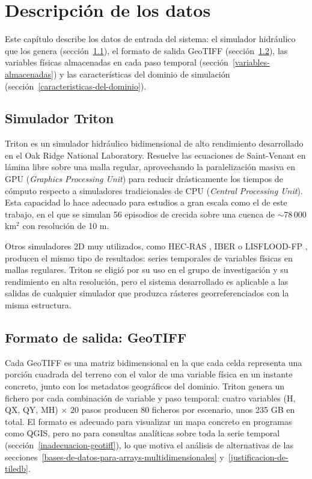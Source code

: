 \chapter{Descripción de los datos}\label{descripcion-de-los-datos}

Este capítulo describe los datos de entrada del sistema: el simulador hidráulico que los genera (sección~\ref{simulador-triton}), el formato de salida GeoTIFF (sección~\ref{formato-de-salida-geotiff}), las variables físicas almacenadas en cada paso temporal (sección~\ref{variables-almacenadas}) y las características del dominio de simulación (sección~\ref{caracteristicas-del-dominio}).

\section{Simulador Triton}\label{simulador-triton}

Triton \cite{triton} es un simulador hidráulico bidimensional de alto rendimiento desarrollado en el Oak Ridge National Laboratory. Resuelve las ecuaciones de Saint-Venant en lámina libre sobre una malla regular, aprovechando la paralelización masiva en GPU (\textit{Graphics Processing Unit}) para reducir drásticamente los tiempos de cómputo respecto a simuladores tradicionales de CPU (\textit{Central Processing Unit}). Esta capacidad lo hace adecuado para estudios a gran escala como el de este trabajo, en el que se simulan 56 episodios de crecida sobre una cuenca de $\sim$78\,000 km$^2$ con resolución de 10 m.

Otros simuladores 2D muy utilizados, como HEC-RAS \cite{hecras}, IBER \cite{iber} o LISFLOOD-FP \cite{bates2010simple}, producen el mismo tipo de resultados: series temporales de variables físicas en mallas regulares. Triton se eligió por su uso en el grupo de investigación y su rendimiento en alta resolución, pero el sistema desarrollado es aplicable a las salidas de cualquier simulador que produzca rásteres georreferenciados con la misma estructura.

\section{Formato de salida: GeoTIFF}\label{formato-de-salida-geotiff}

Cada GeoTIFF es una matriz bidimensional en la que cada celda representa una porción cuadrada del terreno con el valor de una variable física en un instante concreto, junto con los metadatos geográficos del dominio. Triton genera un fichero por cada combinación de variable y paso temporal: cuatro variables (H, QX, QY, MH) $\times$ 20 pasos producen 80 ficheros por escenario, unos 235 GB en total. El formato es adecuado para visualizar un mapa concreto en programas como QGIS, pero no para consultas analíticas sobre toda la serie temporal (sección~\ref{inadecuacion-geotiff}), lo que motiva el análisis de alternativas de las secciones~\ref{bases-de-datos-para-arrays-multidimensionales} y~\ref{justificacion-de-tiledb}.

